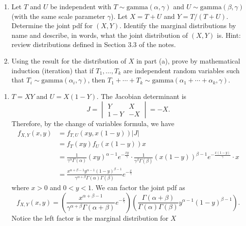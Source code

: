 \documentclass[12pt]{article}
\newenvironment{problem}[2][Problem]{\begin{trivlist}
\item[\hskip \labelsep {\bfseries #1}\hskip \labelsep {\bfseries #2.}]}
{\end{trivlist}}
\begin{document}
\begin{problem}{8}
  \begin{enumerate}
    \item Let $T$ and $U$ be independent with 
    $T \sim \text{gamma}(\alpha, \gamma)$ and 
    $U \sim \text{gamma}(\beta, \gamma)$ 
    (with the same scale parameter $\gamma$). Let $X = T + U$ 
    and $Y = T /(T + U)$. Determine the joint pdf
    for $(X, Y)$. Identify the marginal distributions by name
    and describe, in words, what the joint distribution of $(X, Y)$ is. 
    Hint: review distributions defined in Section 3.3 of
    the notes.
    \item Using the result for the distribution of $X$ in part (a),
    prove by mathematical induction (iteration) that if $T_1, \ldots, T_k$
    are independent random variables such
    that $T_i \sim \text{gamma}(\alpha_i, \gamma)$, 
    then $T_1 + \cdots + T_k \sim 
    \text{gamma}(\alpha_1 + \cdots + \alpha_k, \gamma)$.
  \end{enumerate}
  \begin{enumerate}
    \item $T = XY$ and $U = X(1 - Y)$. The Jacobian determinant is
    \[
      J = 
      \begin{vmatrix}
        Y & X \\
        1 - Y & -X
      \end{vmatrix} = -X.
    \]
    Therefore, by the change of variables formula, we have
    \begin{align*}
      f_{X,Y} (x, y) &= f_{T,U} (xy, x(1 - y)) |J| \\
      &= f_T (xy) f_U (x(1 - y)) x \\
      &= \frac{1}{\gamma^{\alpha} \Gamma(\alpha)} (xy)^{\alpha - 1} e^{-\frac{xy}{\gamma}} 
      \cdot \frac{1}{\gamma^{\beta} \Gamma(\beta)} (x(1 - y))^{\beta - 1} e^{-\frac{x(1 - y)}{\gamma}} 
      \cdot x \\
      &= \frac{x^{\alpha + \beta - 1} y^{\alpha - 1} (1 - y)^{\beta - 1}}{\gamma^{\alpha + \beta} \Gamma(\alpha) \Gamma(\beta)} 
      e^{-\frac{x}{\gamma}}
    \end{align*}
    where $x > 0$ and $0 < y < 1$.
    We can factor the joint pdf as
    \[
      f_{X,Y} (x, y) = 
      \left( \frac{x^{\alpha + \beta - 1}}{\gamma^{\alpha + \beta} \Gamma(\alpha + \beta)} e^{-\frac{x}{\gamma}} \right)
      \left( \frac{\Gamma(\alpha + \beta)}{\Gamma(\alpha) \Gamma(\beta)} y^{\alpha - 1} (1 - y)^{\beta - 1} \right).
    \]
    Notice the left factor is the marginal distribution for $X$

\end{enumerate}
\end{problem}
\end{document}
